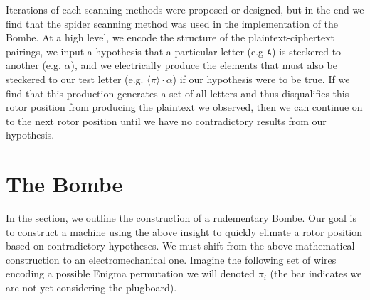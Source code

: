 Iterations of each scanning methods were proposed or designed, but in
the end we find that the spider scanning method was used in the
implementation of the Bombe. At a high level, we encode the structure
of the plaintext-ciphertext pairings, we input a hypothesis that a particular
letter (e.g $\texttt{A}$) is steckered to another (e.g. $\alpha$), and we
electrically produce the elements that must also be steckered to our test letter
(e.g. $\langle\overline{\pi}\rangle\cdot\alpha$) if our hypothesis
were to be true. If we find that this production generates a set of
all letters and thus disqualifies this rotor position from producing
the plaintext we observed, then we can continue on to the next rotor
position until we have no contradictory results from our hypothesis.

\section{The Bombe}

In the section, we outline the construction of a rudementary Bombe.
Our goal is to construct a machine using the above insight to quickly
elimate a rotor position based on contradictory hypotheses. We must
shift from the above mathematical construction to an
electromechanical one. %
Imagine the following set of wires encoding a possible Enigma
permutation we will denoted $\overline\pi_i$ (the bar
indicates we are not yet considering the plugboard).


